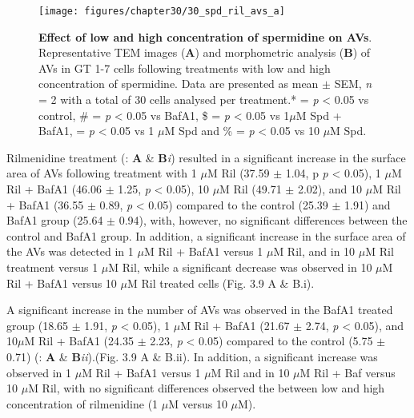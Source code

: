 {\begin{landscape}
\begin{figure}[!htbp]
\center
  \texttt{[image: figures/chapter30/30\_spd\_ril\_avs\_a]}
  \caption[Effect of low and high concentration of spermidine on AVs]{\textbf{Effect of low and high concentration of spermidine on AVs}. Representative TEM images (\textbf{A}) and morphometric analysis (\textbf{B}) of AVs in GT 1-7 cells following treatments with low and high concentration of spermidine. Data are presented as mean $\pm$ SEM, \textit{n} = 2 with a total of 30 cells analysed per treatment.* = \textit{p} < 0.05 vs control, \# = \textit{p} < 0.05 vs BafA1, \$ = \textit{p} < 0.05 vs 1$\mu$M Spd + BafA1, \@ = \textit{p} < 0.05 vs 1 $\mu$M Spd and  \% = \textit{p} < 0.05 vs 10 $\mu$M Spd.}
  \label{fig:30_spd_ril_avs_a}
\end{figure} 
\end{landscape}

Rilmenidine treatment (: \textbf{A} \& \textbf{B}\textit{i}) resulted in a significant increase in the surface area of AVs following treatment with 1 $\mu$M Ril (37.59 $\pm$ 1.04, p \textit{p} < 0.05), 1 $\mu$M Ril + BafA1 (46.06 $\pm$ 1.25, \textit{p} < 0.05), 10 $\mu$M Ril (49.71 $\pm$ 2.02), and 10 $\mu$M Ril + BafA1 (36.55 $\pm$ 0.89, \textit{p} < 0.05) compared to the control (25.39 $\pm$ 1.91) and BafA1 group (25.64 $\pm$ 0.94), with, however, no significant differences between the control and BafA1 group. In addition, a significant increase in the surface area of the AVs was detected in 1 $\mu$M Ril + BafA1 versus 1 $\mu$M Ril, and in 10 $\mu$M Ril treatment versus 1 $\mu$M Ril, while a significant decrease was observed in 10 $\mu$M Ril + BafA1 versus 10 $\mu$M Ril  treated cells (Fig. 3.9 A \& B.i).

A significant increase in the number of AVs was observed in the BafA1 treated group (18.65 $\pm$ 1.91, \textit{p} < 0.05), 1 $\mu$M Ril + BafA1 (21.67 $\pm$ 2.74, \textit{p} < 0.05), and 10$\mu$M Ril + BafA1 (24.35 $\pm$ 2.23, \textit{p} < 0.05) compared to the control (5.75 $\pm$ 0.71) (: \textbf{A} \& \textbf{B}\textit{ii}).(Fig. 3.9 A \& B.ii). In addition, a significant increase was observed in 1 $\mu$M Ril + BafA1 versus 1 $\mu$M Ril and in 10 $\mu$M Ril + Baf versus 10 $\mu$M Ril, with no significant differences observed the between low and high concentration of rilmenidine (1 $\mu$M versus 10 $\mu$M).

}
